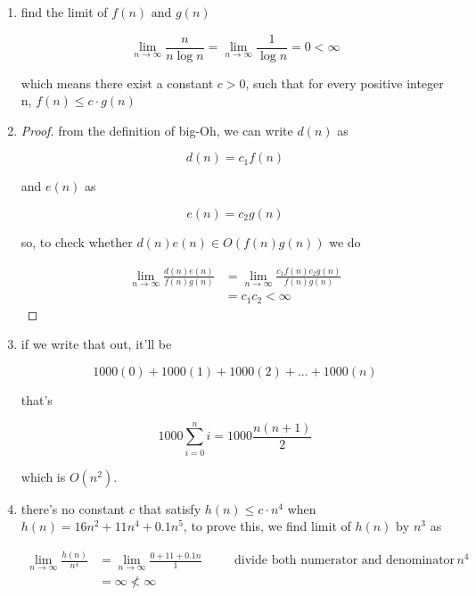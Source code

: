\documentclass{article}
\theoremstyle{remark}
\begin{document}
\begin{enumerate}
    \item find the limit of $f(n) \text{ and } g(n)$

        \[\lim_{n \to \infty} \frac{n}{n\log n} = \lim_{n \to \infty} \frac{1}{\log n} = 0 < \infty\]

        which means there exist a constant $c > 0$, such that for every positive integer n, $f(n) \le c \cdot g(n)$

    \item 
        \begin{proof}
            from the definition of big-Oh, we can write $d(n)$ as 

        \[d(n) = c_1 f(n)\]

        and $e(n)$ as

        \[e(n) = c_2 g(n)\]

        so, to check whether $d(n)e(n) \in O(f(n)g(n))$ we do

        \begin{align*}
            \lim_{n \to \infty} \frac{d(n)e(n)}{f(n)g(n)} &= \lim_{n \to \infty} \frac{c_1f(n)c_2g(n)}{f(n)g(n)} \\
            &= c_1c_2 < \infty
        \end{align*}
        \end{proof}

    \item if we write that out, it'll be

        \[1000(0) + 1000(1) + 1000(2) + ... + 1000(n)\]

        that's

        \[1000 \sum_{i=0}^{n} i = 1000 \frac{n(n+1)}{2}\]

        which is $\boxed{O(n^2)}$.

    \item there's no constant $c$ that satisfy $h(n) \le c \cdot n^4$ when $h(n) = 16n^2 + 11n^4 + 0.1n^5$, to prove this, we find limit of $h(n) \text{ by } n^3$ as

        \begin{align*}
            \lim_{n \to \infty} \frac{h(n)}{n^4} &= \lim_{n \to \infty} \frac{0 + 11 + 0.1n}{1} && \quad \text{divide both numerator and denominator with } n^4 \\
            &= \infty \nless \infty
        \end{align*}

\end{enumerate}
\end{document}
